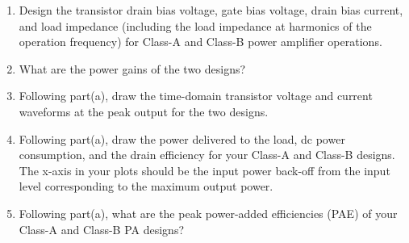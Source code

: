\begin{enumerate}[label=(\alph*)]
    \item {\color{blue} Design the transistor drain bias voltage, gate bias voltage, drain bias current, and load impedance (including the load impedance at harmonics of the operation frequency) for Class-A and Class-B power amplifier operations.}

    \item {\color{blue} What are the power gains of the two designs?}

    \item {\color{blue} Following part(a), draw the time-domain transistor voltage and current waveforms at the peak output for the two designs.}

    \item {\color{blue} Following part(a), draw the power delivered to the load, dc power consumption, and the drain efficiency for your Class-A and Class-B designs. The x-axis in your plots should be the input power back-off from the input level corresponding to the maximum output power.}

    \item {\color{blue} Following part(a), what are the peak power-added efficiencies (PAE) of your Class-A and Class-B PA designs?}
\end{enumerate}


